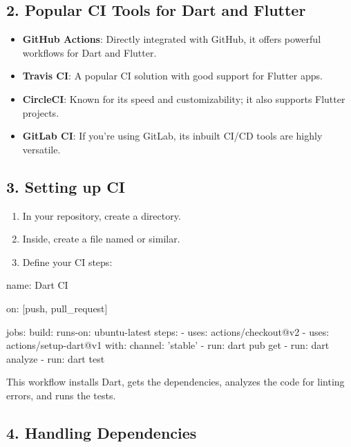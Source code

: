 \subsection*{2. Popular CI Tools for Dart and Flutter}

\begin{itemize}
 \item \textbf{GitHub Actions}: Directly integrated with GitHub, it offers powerful workflows for Dart and Flutter.
 \item \textbf{Travis CI}: A popular CI solution with good support for Flutter apps.
 \item \textbf{CircleCI}: Known for its speed and customizability; it also supports Flutter projects.
 \item \textbf{GitLab CI}: If you're using GitLab, its inbuilt CI/CD tools are highly versatile.
\end{itemize}

\subsection*{3. Setting up CI}


\begin{enumerate}
 \item In your repository, create a  directory.
 \item Inside, create a file named  or similar.
 \item Define your CI steps:
\end{enumerate}

\begin{yamlcode}
name: Dart CI

on: [push, pull_request]

jobs:
  build:
    runs-on: ubuntu-latest
    steps:
    - uses: actions/checkout@v2
    - uses: actions/setup-dart@v1
      with:
        channel: 'stable'
    - run: dart pub get
    - run: dart analyze
    - run: dart test
\end{yamlcode}

This workflow installs Dart, gets the dependencies, analyzes the code for linting errors, and runs the tests.

\subsection*{4. Handling Dependencies}

